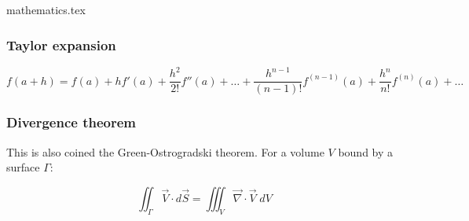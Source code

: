 \begin{flushright} {\tiny {\color{gray} mathematics.tex}} \end{flushright}

\subsubsection{Taylor expansion}

\[
f(a+h) = f(a) + h f'(a) + \frac{h^2}{2!} f''(a) + \dots + \frac{h^{n-1}}{(n-1)!}f^{(n-1)}(a)
+ \frac{h^n}{n!}f^{(n)}(a)+ \dots
\]


\subsubsection{Divergence theorem}

This is also coined the Green-Ostrogradski theorem. For a volume $V$ bound by a surface $\Gamma$: 

\begin{mdframed}[backgroundcolor=blue!5]
\begin{equation}
\iint_\Gamma \vec{V}\cdot d\vec{S} = \iiint_V \vec{\nabla}\cdot\vec{V} \; dV
\end{equation}
\end{mdframed}
